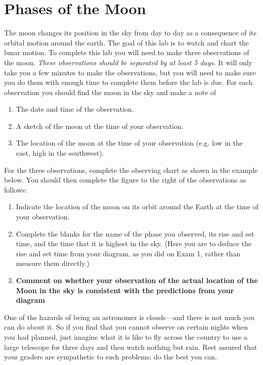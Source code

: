 \documentclass[11pt]{article}
\begin{document}
\newpage

\section{Phases of the Moon}
\label{s:m}

The moon changes its position in the sky from day to day as a consequence of
its orbital motion around the earth.  The goal of this lab is to watch and
chart the lunar motion.
To complete this lab you will need to make three observations of the moon.
\emph{These observations should be separated by at least 5 days.}  It will
only take you a few minutes to make the observations, but you will need to
make sure you do them with enough time to complete them before the lab is due.
For each observation you should find the moon in the sky and make a note of
\begin{enumerate}
\item The date and time of the observation.
\item A sketch of the moon at the time of your observation.
\item The location of the moon at the time of your observation (e.g. low in
the east, high in the southwest).
\end{enumerate}
For the three observations, complete the observing chart as shown in the
example below. You should then complete the figure to the right of the
observations as follows:
\begin{enumerate}
\item Indicate the location of the moon on its orbit around the Earth at the
time of your observation.
\item Complete the blanks for the name of the phase you observed, its rise
and set time, and the time that it is highest in the sky. (Here you are to deduce the rise and set time from your diagram, as you did
on Exam 1, rather than measure them directly.)
\item \textbf{Comment on whether your observation of the actual location of the Moon in the sky
 is consistent with the predictions from your diagram}
\end{enumerate}

One of the hazards of being an astronomer is clouds---and there is not much
you can do about it. So if you find that you cannot observe on certain nights
when you had planned, just imagine what it is like to fly across the country to
use a large telescope for three days and then watch nothing but rain.  Rest
assured that your graders are sympathetic to such problems; do the
best you can.
\end{document}
